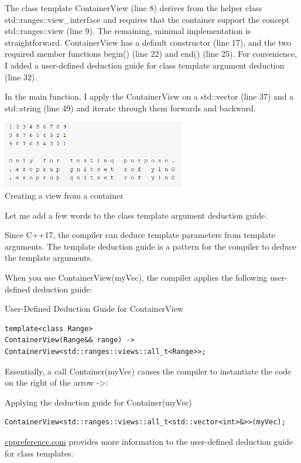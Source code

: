 The class template ContainerView (line 8) derives from the helper class std::ranges::view\_interface and requires that the container support the concept std::ranges::view (line 9). The remaining, minimal implementation is straightforward. ContainerView has a default constructor (line 17), and the two required member functions begin() (line 22) and end() (line 25). For convenience, I added a user-defined deduction guide for class template argument deduction (line 32).

In the main function, I apply the ContainerView on a std::vector (line 37) and a std::string (line 49) and iterate through them forwards and backward.

\begin{center}
\includegraphics[width=0.6\textwidth]{content/3/chapter5/images/1-3.png}\\
Creating a view from a container
\end{center}

Let me add a few words to the class template argument deduction guide.

\begin{tcolorbox}[colback=blue!5!white,colframe=blue!75!black,title={Class Template Argument Deduction Guide}]
Since C++17, the compiler can deduce template parameters from template arguments. The template deduction guide is a pattern for the compiler to deduce the template arguments.

When you use ContainerView(myVec), the compiler applies the following user-defined deduction guide:

\noindent
User-Defined Deduction Guide for ContainerView
\begin{lstlisting}[style=styleCXX]
template<class Range>
ContainerView(Range&& range) -> ContainerView<std::ranges::views::all_t<Range>>;
\end{lstlisting}

Essentially, a call Container(myVec) causes the compiler to instantiate the code on the right of the arrow ->:

\noindent
Applying the deduction guide for Container(myVec)
\begin{lstlisting}[style=styleCXX]
ContainerView<std::ranges::views::all_t<std::vector<int>&>>(myVec);
\end{lstlisting}

\href{https://en.cppreference.com/w/cpp/language/class_template_argument_deduction}{cppreference.com} provides more information to the user-defined deduction guide for class templates.
\end{tcolorbox}

